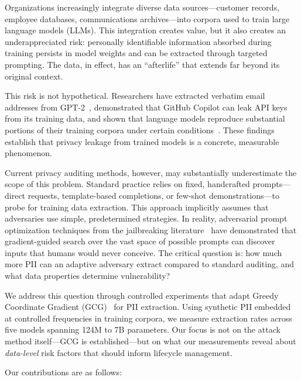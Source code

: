 \documentclass[conference]{IEEEtran}
\begin{document}
Organizations increasingly integrate diverse data sources---customer records, employee databases, communications archives---into corpora used to train large language models (LLMs). This integration creates value, but it also creates an underappreciated risk: personally identifiable information absorbed during training persists in model weights and can be extracted through targeted prompting. The data, in effect, has an ``afterlife'' that extends far beyond its original context.

This risk is not hypothetical. Researchers have extracted verbatim email addresses from GPT-2~\cite{carlini2021extracting}, demonstrated that GitHub Copilot can leak API keys from its training data, and shown that language models reproduce substantial portions of their training corpora under certain conditions~\cite{carlini2023quantifying}. These findings establish that privacy leakage from trained models is a concrete, measurable phenomenon.

Current privacy auditing methods, however, may substantially underestimate the scope of this problem. Standard practice relies on fixed, handcrafted prompts---direct requests, template-based completions, or few-shot demonstrations---to probe for training data extraction. This approach implicitly assumes that adversaries use simple, predetermined strategies. In reality, adversarial prompt optimization techniques from the jailbreaking literature~\cite{zou2023universal} have demonstrated that gradient-guided search over the vast space of possible prompts can discover inputs that humans would never conceive. The critical question is: how much more PII can an adaptive adversary extract compared to standard auditing, and what data properties determine vulnerability?

We address this question through controlled experiments that adapt Greedy Coordinate Gradient (GCG)~\cite{zou2023universal} for PII extraction. Using synthetic PII embedded at controlled frequencies in training corpora, we measure extraction rates across five models spanning 124M to 7B parameters. Our focus is not on the attack method itself---GCG is established---but on what our measurements reveal about \emph{data-level} risk factors that should inform lifecycle management.

Our contributions are as follows:
\end{document}
